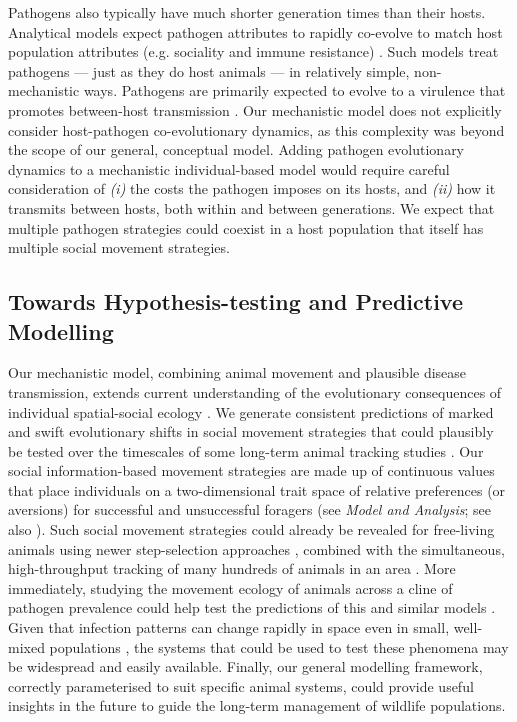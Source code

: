 Pathogens also typically have much shorter generation times than their hosts.
Analytical models expect pathogen attributes to rapidly co-evolve to match host population attributes (e.g. sociality and immune resistance) \citep[][]{bonds2005,prado2009,ashby2022}.
Such models treat pathogens --- just as they do host animals --- in relatively simple, non-mechanistic ways.
Pathogens are primarily expected to evolve to a virulence that promotes between-host transmission \citep{bonds2005}.
Our mechanistic model does not explicitly consider host-pathogen co-evolutionary dynamics, as this complexity was beyond the scope of our general, conceptual model.
Adding pathogen evolutionary dynamics to a mechanistic individual-based model would require careful consideration of \textit{(i)} the costs the pathogen imposes on its hosts, and \textit{(ii)} how it transmits between hosts, both within and between generations.
We expect that multiple pathogen strategies could coexist in a host population that itself has multiple social movement strategies.

\subsection*{Towards Hypothesis-testing and Predictive Modelling}

Our mechanistic model, combining animal movement and plausible disease transmission, extends current understanding of the evolutionary consequences of individual spatial-social ecology \citep{webber2018,albery2021,webber2022}.
We generate consistent predictions of marked and swift evolutionary shifts in social movement strategies that could plausibly be tested over the timescales of some long-term animal tracking studies \citep{wilber2022}.
Our social information-based movement strategies are made up of continuous values that place individuals on a two-dimensional trait space of relative preferences (or aversions) for successful and unsuccessful foragers (see \textit{Model and Analysis}; see also \citealt{gupte2021a}).
Such social movement strategies could already be revealed for free-living animals using newer step-selection approaches \citep{avgar2016}, combined with the simultaneous, high-throughput tracking of many hundreds of animals in an area \citep{nathan2022}.
More immediately, studying the movement ecology of animals across a cline of pathogen prevalence could help test the predictions of this and similar models \citep{wilber2022}.
Given that infection patterns can change rapidly in space even in small, well-mixed populations \citep{albery2022}, the systems that could be used to test these phenomena may be widespread and easily available.
Finally, our general modelling framework, correctly parameterised to suit specific animal systems, could provide useful insights in the future to guide the long-term management of wildlife populations.

